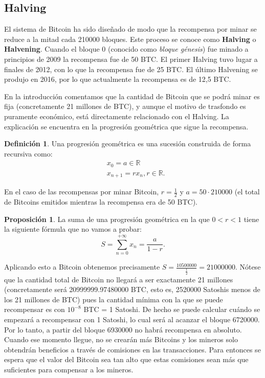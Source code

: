\documentclass[twoside]{article}
\theoremstyle{definition}
\newtheorem{defi}[teorema]{Definición}
\newtheorem{prop}[teorema]{Proposición}
\newcommand{\R}{\mathbb{R}}
\begin{document}
\subsection{Halving}
El sistema de Bitcoin ha sido diseñado de modo que la recompensa por minar se reduce a la mitad cada 210000 bloques. Este proceso se conoce como \textbf{Halving} o \textbf{Halvening}. Cuando el bloque 0 (conocido como \emph{bloque génesis}) fue minado a principios de 2009 la recompensa fue de 50 BTC. El primer Halving tuvo lugar a finales de 2012, con lo que la recompensa fue de 25 BTC. El último Halvening se produjo en 2016, por lo que actualmente la recompensa es de 12,5 BTC. 

En la introducción comentamos que la cantidad de Bitcoin que se podrá minar es fija (concretamente 21 millones de BTC), y aunque el motivo de trasfondo es puramente económico, está directamente relacionado con el Halving. La explicación se encuentra en la progresión geométrica que sigue la recompensa. 

\begin{defi}
Una progresión geométrica es una sucesión construida de forma recursiva como:
\begin{align*}
&x_0=a\in\R\\
&x_{n+1}=rx_n, r\in\R .
\end{align*}
\end{defi}

En el caso de las recompensas por minar Bitcoin, $r=\frac{1}{2}$ y $a=50\cdot 210000$ (el total de Bitcoins emitidos mientras la recompensa era de 50 BTC). \begin{prop}
La suma de una progresión geométrica en la que $0<r<1$ tiene la siguiente fórmula que no vamos a probar:
\[
S=\sum_{n=0}^{+\infty}x_n=\frac{a}{1-r}.
\]
\end{prop}

Aplicando esto a Bitcoin obtenemos precisamente $S=\frac{10500000}{\frac{1}{2}} = 21000000$. Nótese que la cantidad total de Bitcoin no llegará a ser exactamente 21 millones (concretamente será 20999999.97480000 BTC, esto es, 2520000 Satoshis menos de los 21 millones de BTC) pues la cantidad mínima con la que se puede recompensar es con $10^{-8}$ BTC = 1 Satoshi. De hecho se puede calcular cuándo se empezará a recompensar con 1 Satoshi, lo cual será al acanzar el bloque 6720000. Por lo tanto, a partir del bloque 6930000 no habrá recompensa en absoluto. Cuando ese momento llegue, no se crearán más Bitcoins y los mineros solo obtendrán beneficios a través de comisiones en las transacciones. Para entonces se espera que el valor del Bitcoin sea tan alto que estas comisiones sean más que suficientes para compensar a los mineros.\\
\end{document}
